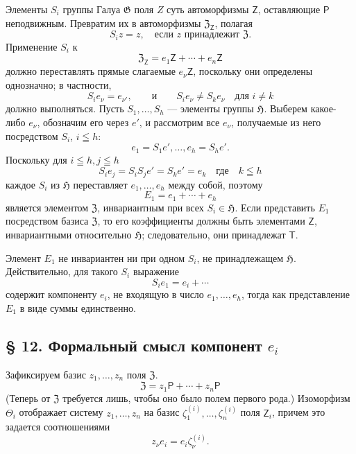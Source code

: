 \documentclass[11pt]{article}
\begin{document}
Элементы \(S_i\) группы Галуа \(\mathfrak G\) поля \(Z\) суть автоморфизмы \(\mathsf Z\), оставляющие \(\mathsf P\) неподвижным. Превратим их в автоморфизмы \(\mathfrak Z_{\mathsf Z}\), полагая
\[
S_i z=z,\quad \text{если } z \text{ принадлежит } \mathfrak Z.
\]
Применение \(S_i\) к
\[
\mathfrak Z_{\mathsf Z}=e_1\mathsf Z+\cdots+e_n\mathsf Z
\]
должно переставлять прямые слагаемые \(e_\nu\mathsf Z\), поскольку они определены однозначно; в частности,
\[
S_i e_\nu=e_{\nu'},\qquad\text{и}\qquad S_i e_\nu\ne S_k e_\nu
\quad\text{для } i\ne k
\]
должно выполняться. Пусть \(S_1,\ldots,S_h\) --- элементы группы \(\mathfrak H\). Выберем какое-либо \(e_\nu\), обозначим его через \(e'\), и рассмотрим все \(e_\nu\), получаемые из него посредством \(S_i\), \(i\leqq h\):
\[
e_1=S_1e',\ldots,e_h=S_he'.
\]
Поскольку для \(i\leqq h, j\leqq h\)
\[
S_i e_j=S_iS_j e'=S_ke'=e_k \quad \text{где}\quad k\leqq h
\]
каждое \(S_i\) из \(\mathfrak H\) переставляет \(e_1,\ldots,e_h\) между собой, поэтому
\[
E_1=e_1+\cdots+e_h
\]
является элементом \(\mathfrak Z\), инвариантным при всех \(S_i\in\mathfrak H\). Если представить \(E_1\) посредством базиса \(\mathfrak Z\), то его коэффициенты должны быть элементами \(\mathsf Z\), инвариантными относительно \(\mathfrak H\); следовательно, они принадлежат \(\mathsf T\).

Элемент \(E_1\) не инвариантен ни при одном \(S_i\), не принадлежащем \(\mathfrak H\). Действительно, для такого \(S_i\) выражение
\[
S_i e_1=e_i+\cdots
\]
содержит компоненту \(e_i\), не входящую в число \(e_1,\ldots,e_h\), тогда как представление \(E_1\) в виде суммы единственно.

\subsection*{§ 12. Формальный смысл компонент \(e_i\)}\label{die-formale-bedeutung-der-komponenten-ei}

Зафиксируем базис \(z_1,\ldots,z_n\) поля \(\mathfrak Z\).
\[
\mathfrak Z=z_1\mathsf P+\cdots+z_n\mathsf P
\]
(Теперь от \(\mathfrak Z\) требуется лишь, чтобы оно было полем первого рода.) Изоморфизм \(\Theta_i\) отображает систему \(z_1,\ldots,z_n\) на базис \(\zeta_1^{(i)},\ldots,\zeta_n^{(i)}\) поля \(\mathsf Z_i\), причем это задается соотношениями
\[
z_\nu e_i=e_i\zeta_\nu^{(i)} .
\]
\end{document}
